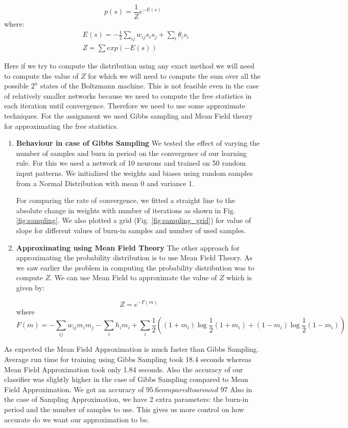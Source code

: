 \documentclass{article}
\begin{document}
$$ p(s) = \frac{1}{Z} e^{-E(s)} $$
where: 
\begin{equation}
  \begin{split}
    & E(s) = - \frac{1}{2} \sum_{ij} w_{ij} s_i s_j  + \sum_i \theta_i s_i \\
    & Z = \sum exp(-E(s)) 
  \end{split}
\end{equation}

Here if we try to compute the distribution using any exact method we will need
to compute the value of $ Z $ for which we will need to compute the sum over
all the possible $ 2^n $ states of the Boltzmann machine. This is not feasible 
even in the case of relatively smaller networks because we need to compute the 
free statistics in each iteration until convergence. Therefore we need to use
some approximate techniques. For the assignment we used Gibbs sampling and 
Mean Field theory for approximating the free statistics.

\begin{enumerate}
  \item \textbf{Behaviour in case of Gibbs Sampling}
    We tested the effect of varying the number of samples and burn in period on
    the convergence of our learning rule. For this we used a network of 10 
    neurons and trained on 50 random input patterns. We initialized the weights
    and biases using random samples from a Normal Distribution with mean 0 and 
    variance 1.

    For comparing the rate of convergence, we fitted a straight line to the 
    absolute change in weights with number of iterations as shown in Fig. 
    \ref{fig:sampling}. We also plotted a grid (Fig. \ref{fig:sampling_grid}) for 
    value of slope for different values of burn-in samples and number of used
    samples.


  \item \textbf{Approximating using Mean Field Theory}
    The other approach for approximating the probability distribution is to 
    use Mean Field Theory. As we saw earlier the problem in computing the probability 
    distribution was to compute $ Z $. We can use Mean Field to approximate the
    value of $ Z $ which is given by:

    $$ Z = e^{-F(m)} $$
    where
    $$ F(m) = - \sum_{ij} w_{ij} m_i m_j - \sum_{i} h_i m_i + \sum_{i} \frac{1}{2}
    \left ( (1+m_i) \log \frac{1}{2} (1 + m_i) + (1-m_i) \log \frac{1}{2} (1-m_i) \right) $$
    

\end{enumerate}
As expected the Mean Field Approximation is much faster than Gibbs Sampling.
Average run time for training using Gibbs Sampling took 18.4 seconds whereas
Mean Field Approximation took only 1.84 seconds. Also the accuracy of our
classifier was slightly higher in the case of Gibbs Sampling compared to Mean
Field Approximation. We got an accuracy of $ 95.6%
compared to around $ 97%
Also in the case of Sampling Approximation, we have 2 extra parameters: the 
burn-in period and the number of samples to use. This gives us more control on 
how accurate do we want our approximation to be.
\end{document}
